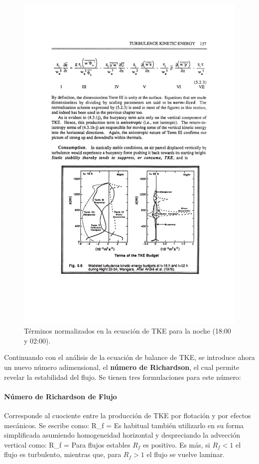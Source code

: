 \begin{figure}[h!]
	\centering
		\includegraphics[width=0.8\linewidth,trim={3.2cm 4.8cm 2.8cm 12.1cm},clip]{Imagenes/03/tke2}
	\caption{Términos normalizados en la ecuación de TKE para la noche (18:00 y 02:00).}
	\label{fig:03_tke2}
\end{figure}
 
Continuando con el análisis de la ecuación de balance de TKE, se introduce ahora un nuevo número adimensional, el \textbf{número de Richardson}, el cual permite revelar la estabilidad del flujo. Se tienen tres formulaciones para este número:

\paragraph{Número de Richardson de Flujo} Corresponde al cuociente entre la producción de TKE por flotación y por efectos mecánicos. Se escribe como:
\be R_f =  \ee
Es habitual también utilizarlo en su forma simplificada asumiendo homogeneidad horizontal y despreciando la advección vertical como:
\be R_f =  \ee
Para flujos estables $R_f$ es positivo. Es más, si $R_f < 1$ el flujo es turbulento, mientras que, para $R_f>1$ el flujo se vuelve laminar.
